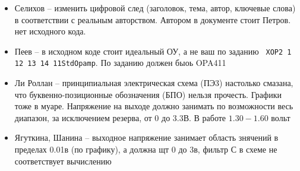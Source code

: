 \begin{itemize}
\item Селихов -- изменить цифровой след (заголовок, тема, автор, ключевые слова) в соответствии с реальным авторством. Автором в документе стоит Петров. нет исходного кода.

\item Пеев -- в исходном коде стоит идеальный ОУ, а не ваш по заданию
\texttt{ XOP2         1 12 13 14 11StdOpamp}. По заданию должен быоь OPA411
\item  Ли Роллан -- принципиальная электрическая схема (ПЭ3) настолько смазана, что буквенно-позиционные обозначения (БПО) нельзя прочесть. Графики тоже в муаре. 
Напряжение на выходе должно занимать по возможности весь диапазон, за исключением резерва, от 0 до 3.3В. В работе $1.30-1.60$ вольт



\item Ягуткина, Шанина --
 выходное напряжение занимает область знячений в пределах 0.01в (по графику), а должна щт 0 до 3в, фильтр С в схеме не соответствует вычислению
\end{itemize}

